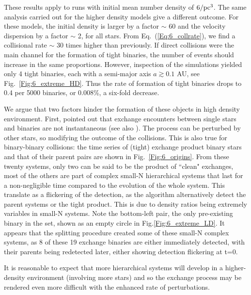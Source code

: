 
 These results apply to runs with initial mean number density of $6 / {\textrm{pc}}^3$.  The same analysis carried out for the higher 
 density models give a different outcome. 
For these models, the initial density is larger by a factor $\sim$ 60 and the velocity dispersion  by a factor $\sim$ 2, 
for all stars. From Eq.~(\ref{Eq:6_collrate}),  we find a collisional rate  $\sim$ 30 times higher than previously. 
If direct collisions were 
the main channel for the formation of tight binaries, the number of events should  increase in the same proportions.
However, inspection of the simulations yielded only 4 tight binaries, each  with a semi-major axis $a \gtrsim 0.1$ AU, see Fig.~\ref{Fig:6_extreme_HD}. Thus the rate of formation of tight binaries drops to 0.4 per 5000 binaries, or 0.008\%, a six-fold decrease. 


We argue that two factors hinder the formation of these objects in high density environment. First, \cite{Geller2015} pointed out  that exchange encounters between single stars and binaries are not instantaneous (see also \citealt{Hut1983}).  The process can be perturbed by other stars, so modifying the outcome of the collisions. This is also true for binary-binary collisions: the time series of (tight) exchange product binary stars and that of their parent pairs are shown in Fig.~\ref{Fig:6_origins}. From these twenty systems, only two can be said to be the product of ``clean" exchanges, most of the others are part of complex small-N hierarchical systems that last for a non-negligible time compared to the evolution of the whole system. This translate as a flickering of the detection, as the algorithm alternatively detect the parent systems or the tight product. This is due to density ratios being extremely variables in small-N systems. Note the bottom-left pair, the only pre-existing binary in the set, shown as an empty circle in Fig.\ref{Fig:6_extreme_LD}. It appears that the splitting procedure created some of these small-N complex systems, as 8 of these 19 exchange binaries are either immediately detected, with their parents being redetected later, either showing detection flickering at t=0. 

It is reasonable to  expect that more hierarchical systems will develop in a higher-density environment (involving more stars)  and so the exchange process may be rendered even more difficult with the enhanced rate of perturbations.



